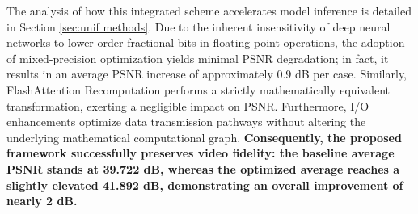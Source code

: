 The analysis of how this integrated scheme accelerates model inference is detailed in Section \ref{sec:unif methods}. Due to the inherent insensitivity of deep neural networks to lower-order fractional bits in floating-point operations, the adoption of mixed-precision optimization yields minimal PSNR degradation; in fact, it results in an average PSNR increase of approximately 0.9 dB per case. Similarly, FlashAttention Recomputation performs a strictly mathematically equivalent transformation, exerting a negligible impact on PSNR. Furthermore, I/O enhancements optimize data transmission pathways without altering the underlying mathematical computational graph. \textbf{Consequently, the proposed framework successfully preserves video fidelity: the baseline average PSNR stands at 39.722 dB, whereas the optimized average reaches a slightly elevated 41.892 dB, demonstrating an overall improvement of nearly 2 dB.}



